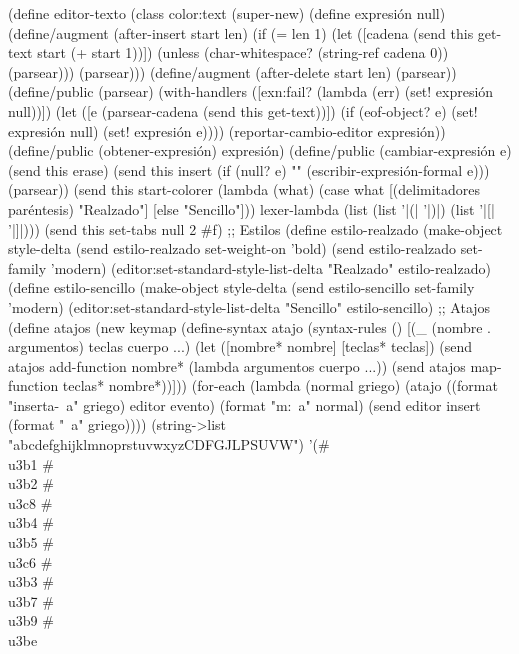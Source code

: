 \documentclass[10pt,oneside,openany,letterpaper]{book}
\begin{document}
(define editor-texto%
  (class color:text%
    (super-new)
    (define expresión null)
    (define/augment (after-insert start len)
      (if (= len 1)
          (let ([cadena (send this get-text start (+ start 1))])
            (unless (char-whitespace? (string-ref cadena 0))
              (parsear)))
          (parsear)))
    (define/augment (after-delete start len)
      (parsear))
    (define/public (parsear)
      (with-handlers ([exn:fail? (lambda (err) (set! expresión null))])
        (let ([e (parsear-cadena (send this get-text))])
          (if (eof-object? e)
              (set! expresión null)
              (set! expresión e))))
      (reportar-cambio-editor expresión))
    (define/public (obtener-expresión)
      expresión)
    (define/public (cambiar-expresión e)
      (send this erase)
      (send this insert (if (null? e) "" (escribir-expresión-formal e)))
      (parsear))
    (send this start-colorer
          (lambda (what)
            (case what
              [(delimitadores paréntesis) "Realzado"]
              [else "Sencillo"]))
          lexer-lambda
          (list (list '|(| '|)|)
                (list '|[| '|]|)))
    (send this set-tabs null 2 #f)
    ;; Estilos
    (define estilo-realzado (make-object style-delta%
    (send estilo-realzado set-weight-on 'bold)
    (send estilo-realzado set-family 'modern)
    (editor:set-standard-style-list-delta "Realzado" estilo-realzado)
    (define estilo-sencillo (make-object style-delta%
    (send estilo-sencillo set-family 'modern)
    (editor:set-standard-style-list-delta "Sencillo" estilo-sencillo)
    ;; Atajos
    (define atajos (new keymap%
    (define-syntax atajo
      (syntax-rules ()
        [(_ (nombre . argumentos) teclas cuerpo ...)
         (let ([nombre* nombre]
               [teclas* teclas])
           (send atajos add-function nombre*
                 (lambda argumentos
                   cuerpo ...))
           (send atajos map-function teclas* nombre*))]))
    (for-each (lambda (normal griego)
                (atajo ((format "inserta-~a" griego) editor evento) (format "m:~a" normal)
                       (send editor insert (format "~a" griego))))
              (string->list "abcdefghijklmnoprstuvwxyzCDFGJLPSUVW")
              '(#\\u3b1 #\\u3b2 #\\u3c8 #\\u3b4 #\\u3b5 #\\u3c6 #\\u3b3 #\\u3b7 #\\u3b9 #\\u3be
\end{document}
